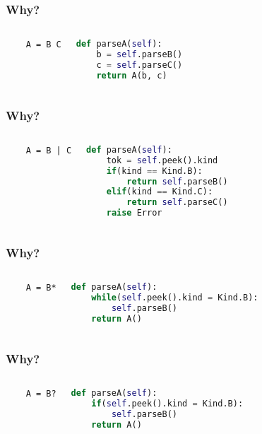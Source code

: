 \documentclass{beamer}
\begin{document}
    \begin{frame}[fragile]
    \frametitle{Why?}
    \begin{columns}
    \begin{verbatim}
    A = B C
    \end{verbatim}
    \pause
    \begin{lstlisting}[language=Python]
def parseA(self):
    b = self.parseB()
    c = self.parseC()
    return A(b, c)
        \end{lstlisting}
    \end{columns}
    \end{frame}

    \begin{frame}[fragile]
    \frametitle{Why?}
    \begin{columns}
    \begin{verbatim}
    A = B | C
    \end{verbatim}
    \pause
    \begin{lstlisting}[language=Python]
def parseA(self):
    tok = self.peek().kind
    if(kind == Kind.B):
        return self.parseB()
    elif(kind == Kind.C):
        return self.parseC()
    raise Error
        \end{lstlisting}
    \end{columns}
    \end{frame}

    \begin{frame}[fragile]
    \frametitle{Why?}
    \begin{columns}
    \begin{verbatim}
    A = B*
    \end{verbatim}
    \pause
    \begin{lstlisting}[language=Python]
def parseA(self):
    while(self.peek().kind = Kind.B):
        self.parseB()
    return A()
        \end{lstlisting}
    \end{columns}
    \end{frame}

    \begin{frame}[fragile]
    \frametitle{Why?}
    \begin{columns}
    \begin{verbatim}
    A = B?
    \end{verbatim}
    \pause
    \begin{lstlisting}[language=Python]
def parseA(self):
    if(self.peek().kind = Kind.B):
        self.parseB()
    return A()
        \end{lstlisting}
    \end{columns}
    \end{frame}
\end{document}
